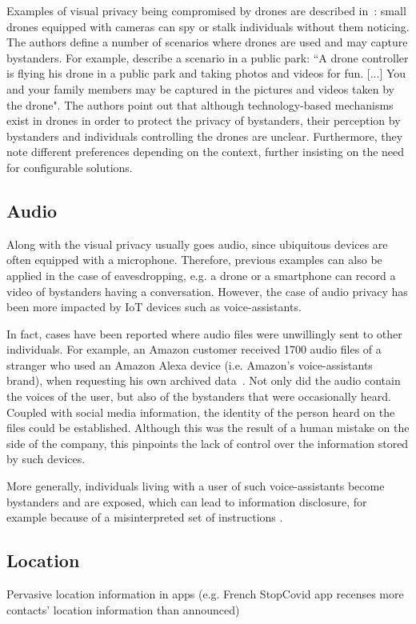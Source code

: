 \documentclass[conference]{IEEEtran}
\begin{document}
Examples of visual privacy being compromised by drones are described in~\cite{yao2017privacy}: small drones equipped with cameras can spy or stalk individuals without them noticing. The authors define a number of scenarios where drones are used and may capture bystanders. For example, describe a scenario in a public park: ``A drone controller is flying his drone in a public park and taking photos and videos for fun. [...] You and your family members may be captured in the pictures and videos taken by the drone". The authors point out that although technology-based mechanisms exist in drones in order to protect the privacy of bystanders, their perception by bystanders and individuals controlling the drones are unclear. Furthermore, they note different preferences depending on the context, further insisting on the need for configurable solutions.

\subsection{Audio}\label{Audio}
Along with the visual privacy usually goes audio, since ubiquitous devices are often equipped with a microphone. Therefore, previous examples can also be applied in the case of eavesdropping, e.g. a drone or a smartphone can record a video of bystanders having a conversation. However, the case of audio privacy has been more impacted by \ac{IoT} devices such as voice-assistants. 

In fact, cases have been reported where audio files were unwillingly sent to other individuals. For example, an Amazon customer received 1700 audio files of a stranger who used an Amazon Alexa device (i.e. Amazon's voice-assistants brand), when requesting his own archived data~\cite{huffpost2018amazon}. Not only did the audio contain the voices of the user, but also of the bystanders that were occasionally heard. Coupled with social media information, the identity of the person heard on the files could be established. Although this was the result of a human mistake on the side of the company, this pinpoints the lack of control over the information stored by such devices. 

More generally, individuals living with a user of such voice-assistants become bystanders and are exposed, which can lead to information disclosure, for example because of a misinterpreted set of instructions \cite{huffpost2018amazon}. 

\subsection{Location}\label{Location}
Pervasive location information in apps (e.g. French StopCovid app recenses more contacts’ location information than announced)
\end{document}
